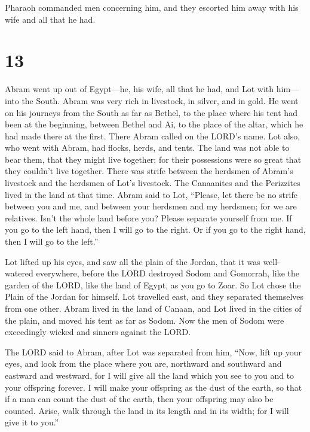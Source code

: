  Pharaoh commanded men concerning him, and they escorted
him away with his wife and all that he had.

\hypertarget{section-12}{%
\section{13}\label{section-12}}

 Abram went up out of Egypt---he, his wife, all that he
had, and Lot with him---into the South.  Abram was very
rich in livestock, in silver, and in gold.  He went on his
journeys from the South as far as Bethel, to the place where his tent
had been at the beginning, between Bethel and Ai,  to the
place of the altar, which he had made there at the first. There Abram
called on the LORD's name.  Lot also, who went with Abram,
had flocks, herds, and tents.  The land was not able to
bear them, that they might live together; for their possessions were so
great that they couldn't live together.  There was strife
between the herdsmen of Abram's livestock and the herdsmen of Lot's
livestock. The Canaanites and the Perizzites lived in the land at that
time.  Abram said to Lot, ``Please, let there be no strife
between you and me, and between your herdsmen and my herdsmen; for we
are relatives.  Isn't the whole land before you? Please
separate yourself from me. If you go to the left hand, then I will go to
the right. Or if you go to the right hand, then I will go to the left.''

 Lot lifted up his eyes, and saw all the plain of the
Jordan, that it was well-watered everywhere, before the LORD destroyed
Sodom and Gomorrah, like the garden of the LORD, like the land of Egypt,
as you go to Zoar.  So Lot chose the Plain of the Jordan
for himself. Lot travelled east, and they separated themselves from one
other.  Abram lived in the land of Canaan, and Lot lived
in the cities of the plain, and moved his tent as far as Sodom.
 Now the men of Sodom were exceedingly wicked and sinners
against the LORD.

 The LORD said to Abram, after Lot was separated from
him, ``Now, lift up your eyes, and look from the place where you are,
northward and southward and eastward and westward,  for I
will give all the land which you see to you and to your offspring
forever.  I will make your offspring as the dust of the
earth, so that if a man can count the dust of the earth, then your
offspring may also be counted.  Arise, walk through the
land in its length and in its width; for I will give it to you.''

